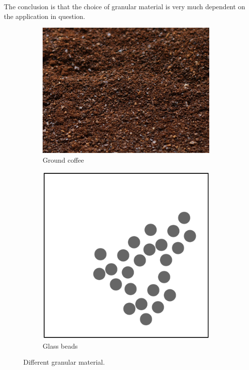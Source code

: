 The conclusion is that the choice of granular material is very much dependent on the application in question. 

\begin{figure}
\centering
\begin{subfigure}{.5\textwidth}
  \centering
  \includegraphics[width=.9\linewidth]{figures/jamming/coffee-grains}
  \caption{Ground coffee}
\end{subfigure}%
\begin{subfigure}{.5\textwidth}
  \centering
  \includegraphics[width=.9\linewidth]{figures/jamming/glass-beads}
  \caption{Glass beads}
\end{subfigure}
\caption{Different granular material.}
\label{fig:ch:jamming:particles-close-up}
\end{figure}

